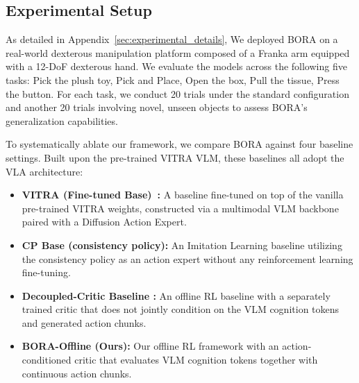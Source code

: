 \documentclass{article}
\begin{document}
\vspace{-2mm}
\subsection{Experimental Setup}
\vspace{-1mm}
\label{sec:setup}

As detailed in Appendix~\ref{sec:experimental_details}, We deployed BORA on a real-world dexterous manipulation platform composed of a Franka arm equipped with a 12-DoF dexterous hand. We evaluate the models across the following five tasks: Pick the plush toy, Pick and Place, Open the box, Pull the tissue, Press the button. For each task, we conduct 20 trials under the standard configuration and another 20 trials involving novel, unseen objects to assess BORA's generalization capabilities.

To systematically ablate our framework, we compare BORA against four baseline settings. Built upon the pre-trained VITRA VLM, these baselines all adopt the VLA architecture:

\begin{itemize}[nosep,leftmargin=*] 

\item \textbf{VITRA (Fine-tuned Base)~\cite{li2025scalable}:} A baseline fine-tuned on top of the vanilla pre-trained VITRA weights, constructed via a multimodal VLM backbone paired with a Diffusion Action Expert.

\item \textbf{CP Base (consistency policy):} An Imitation Learning baseline utilizing the consistency policy as an action expert without any reinforcement learning fine-tuning. 

\item \textbf{Decoupled-Critic Baseline \cite{luo2024serl}:} An offline RL baseline with a separately trained critic that does not jointly condition on the VLM cognition tokens and generated action chunks.

\item \textbf{BORA-Offline (Ours):} Our offline RL framework with an action-conditioned critic that evaluates VLM cognition tokens together with continuous action chunks.

\end{itemize}
\end{document}

